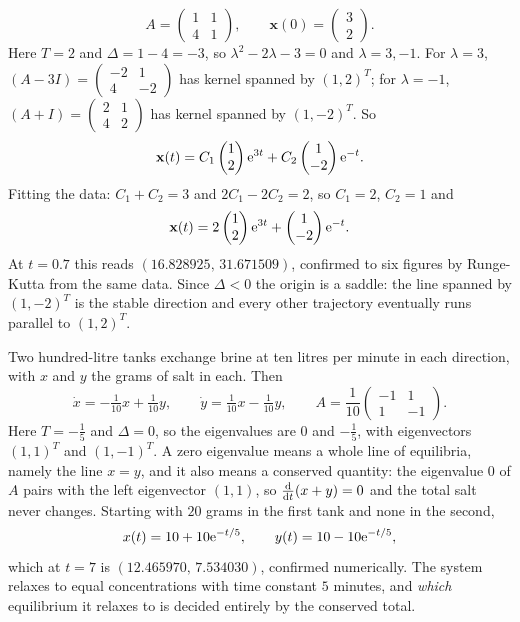 \begin{worked}
\[A=\begin{pmatrix}1&1\\4&1\end{pmatrix},\qquad \mathbf{x}(0)=\begin{pmatrix}3\\2\end{pmatrix}.\]
Here $T=2$ and $\Delta=1-4=-3$, so $\lambda^{2}-2\lambda-3=0$ and $\lambda=3,-1$. For $\lambda=3$, $(A-3I)=\begin{pmatrix}-2&1\\4&-2\end{pmatrix}$ has kernel spanned by $(1,2)^{T}$; for $\lambda=-1$, $(A+I)=\begin{pmatrix}2&1\\4&2\end{pmatrix}$ has kernel spanned by $(1,-2)^{T}$. So
\[\mathbf{x}(t)=C_1\begin{pmatrix}1\\2\end{pmatrix}\mathrm{e}^{3t}+C_2\begin{pmatrix}1\\-2\end{pmatrix}\mathrm{e}^{-t}.\]
Fitting the data: $C_1+C_2=3$ and $2C_1-2C_2=2$, so $C_1=2$, $C_2=1$ and
\[\mathbf{x}(t)=2\begin{pmatrix}1\\2\end{pmatrix}\mathrm{e}^{3t}+\begin{pmatrix}1\\-2\end{pmatrix}\mathrm{e}^{-t}.\]
At $t=0.7$ this reads $(16.828925,\,31.671509)$, confirmed to six figures by Runge-Kutta from the same data. Since $\Delta<0$ the origin is a saddle: the line spanned by $(1,-2)^{T}$ is the stable direction and every other trajectory eventually runs parallel to $(1,2)^{T}$.
\end{worked}

\begin{worked}
Two hundred-litre tanks exchange brine at ten litres per minute in each direction, with $x$ and $y$ the grams of salt in each. Then
\[\dot x=-\tfrac1{10}x+\tfrac1{10}y,\qquad \dot y=\tfrac1{10}x-\tfrac1{10}y,\qquad
A=\frac1{10}\begin{pmatrix}-1&1\\1&-1\end{pmatrix}.\]
Here $T=-\tfrac15$ and $\Delta=0$, so the eigenvalues are $0$ and $-\tfrac15$, with eigenvectors $(1,1)^{T}$ and $(1,-1)^{T}$. A zero eigenvalue means a whole line of equilibria, namely the line $x=y$, and it also means a conserved quantity: the eigenvalue $0$ of $A$ pairs with the left eigenvector $(1,1)$, so $\frac{\mathrm{d}}{\mathrm{d}t}(x+y)=0$ and the total salt never changes. Starting with $20$ grams in the first tank and none in the second,
\[x(t)=10+10\mathrm{e}^{-t/5},\qquad y(t)=10-10\mathrm{e}^{-t/5},\]
which at $t=7$ is $(12.465970,\,7.534030)$, confirmed numerically. The system relaxes to equal concentrations with time constant $5$ minutes, and \emph{which} equilibrium it relaxes to is decided entirely by the conserved total.
\end{worked}

